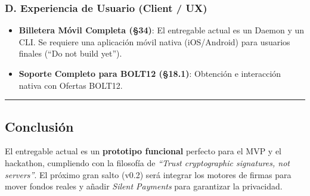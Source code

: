 \documentclass[
]{article}
\providecommand{\tightlist}{%
  \setlength{\itemsep}{0pt}\setlength{\parskip}{0pt}}
\begin{document}
\hypertarget{d.-experiencia-de-usuario-client-ux}{%
\subsubsection{D. Experiencia de Usuario (Client /
UX)}\label{d.-experiencia-de-usuario-client-ux}}

\begin{itemize}
\tightlist
\item
  \textbf{Billetera Móvil Completa (§34)}: El entregable actual es un
  Daemon y un CLI. Se requiere una aplicación móvil nativa (iOS/Android)
  para usuarios finales (``Do not build yet'').
\item
  \textbf{Soporte Completo para BOLT12 (§18.1)}: Obtención e interacción
  nativa con Ofertas BOLT12.
\end{itemize}

\begin{center}\rule{0.5\linewidth}{0.5pt}\end{center}

\hypertarget{conclusiuxf3n}{%
\subsection{Conclusión}\label{conclusiuxf3n}}

El entregable actual es un \textbf{prototipo funcional} perfecto para el
MVP y el hackathon, cumpliendo con la filosofía de \emph{``Trust
cryptographic signatures, not servers''}. El próximo gran salto (v0.2)
será integrar los motores de firmas para mover fondos reales y añadir
\emph{Silent Payments} para garantizar la privacidad.
\end{document}
